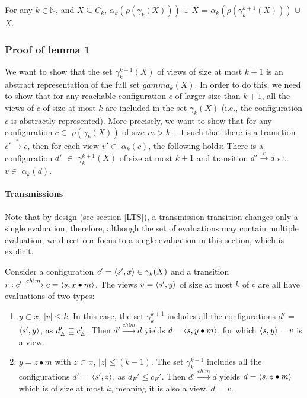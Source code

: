 \begin{lemma}
\label{lemma1}
For any $k\in\mathbb{N}$, and $X\subseteq C_k$, $\alpha_k(\rho(\gamma_k(X)))$ $\cup$ $X$ = $\alpha_k(\rho(\gamma_k^{k+1}(X)))$ $\cup$ $X$.
\end{lemma}

\subsubsection{Proof of lemma 1}
We want to show that the set $\gamma_k^{k+1}(X)$ of views of size at most $k+1$ is an abstract representation of the full set $gamma_k(X)$. In order to do this, we need to show that for any reachable configuration $c$ of larger size than $k+1$, all the views of $c$ of size at most $k$ are included in the set $\gamma_k(X)$ (i.e., the configuration $c$ is abstractly represented). More precisely, we want to show that for any configuration $c \in$ $\rho(\gamma_k(X))$ of size $m > k + 1$ such that there is a transition  $c' \xrightarrow{r} c$, then for each view $v' \in$ $\alpha_k(c)$, the following holds: There is a configuration $d'$ $\in$ $\gamma_k^{k+1}(X)$ of size at most $k+1$ and transition $ d' \xrightarrow{r} d$ s.t. $v \in$ $\alpha_k(d)$.

\paragraph{Transmissions}
\label{proofTransmission}
Note that by design (see section \ref{LTS}), a transmission transition changes only a single evaluation, therefore, although the set of evaluations may contain multiple evaluation, we direct our focus to a single evaluation in this section, which is explicit.

Consider a configuration $c' = \langle s', x\rangle \in \gamma_k(X)$ and a transition $r: c' \xrightarrow{ch!m} c = \langle s,x \bullet m\rangle$. The views $v = \langle s', y\rangle$ of size at most $k$ of $c$ are all have evaluations of two types:

\begin{enumerate}
\item
$y \subset x$, $|v| \leq k$. In this case, the set $\gamma_k^{k+1}$ includes all the configurations $d'$ = $\langle s', y\rangle$, as $d_E' \sqsubseteq c_E'$. Then $d' \xrightarrow{ch!m} d$ yields $d = \langle s, y\bullet m\rangle$, for which $\langle s, y\rangle = v$ is a view.
\item
$y = z\bullet m$ with $z \subset x$, $|z| \leq (k-1)$. The set $\gamma_k^{k+1}$ includes all the configurations $d'$ = $\langle s', z\rangle$, as $d_E' \leq c_E'$. Then $d' \xrightarrow{ch!m} d$ yields $d = \langle s, z\bullet m\rangle$ which is of size at most $k$, meaning it is also a view, $d$ = $v$.
\end{enumerate}


